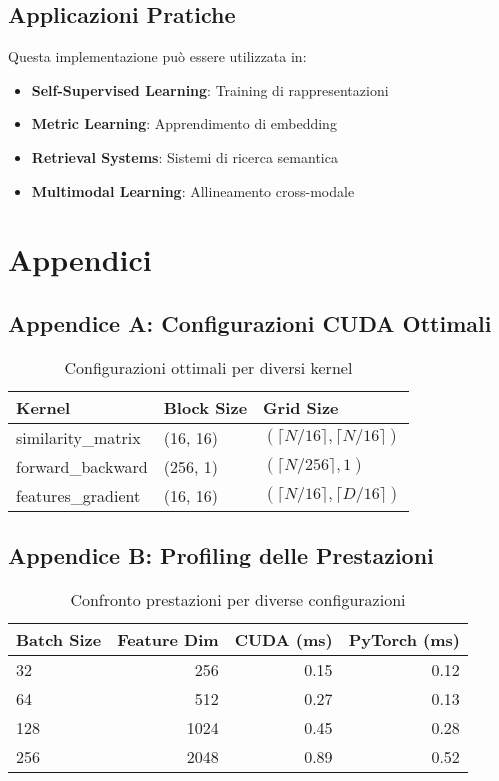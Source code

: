 \documentclass[a4paper,11pt]{article}
\begin{document}
\subsection{Applicazioni Pratiche}

Questa implementazione può essere utilizzata in:
\begin{itemize}
    \item \textbf{Self-Supervised Learning}: Training di rappresentazioni
    \item \textbf{Metric Learning}: Apprendimento di embedding
    \item \textbf{Retrieval Systems}: Sistemi di ricerca semantica
    \item \textbf{Multimodal Learning}: Allineamento cross-modale
\end{itemize}

\section{Appendici}

\subsection{Appendice A: Configurazioni CUDA Ottimali}

\begin{table}[H]
\centering
\begin{tabular}{|l|l|l|}
\hline
\textbf{Kernel} & \textbf{Block Size} & \textbf{Grid Size} \\
\hline
similarity\_matrix & (16, 16) & $(\lceil N/16 \rceil, \lceil N/16 \rceil)$ \\
forward\_backward & (256, 1) & $(\lceil N/256 \rceil, 1)$ \\
features\_gradient & (16, 16) & $(\lceil N/16 \rceil, \lceil D/16 \rceil)$ \\
\hline
\end{tabular}
\caption{Configurazioni ottimali per diversi kernel}
\end{table}

\subsection{Appendice B: Profiling delle Prestazioni}

\begin{table}[H]
\centering
\begin{tabular}{|l|r|r|r|}
\hline
\textbf{Batch Size} & \textbf{Feature Dim} & \textbf{CUDA (ms)} & \textbf{PyTorch (ms)} \\
\hline
32 & 256 & 0.15 & 0.12 \\
64 & 512 & 0.27 & 0.13 \\
128 & 1024 & 0.45 & 0.28 \\
256 & 2048 & 0.89 & 0.52 \\
\hline
\end{tabular}
\caption{Confronto prestazioni per diverse configurazioni}
\end{table}
\end{document}

